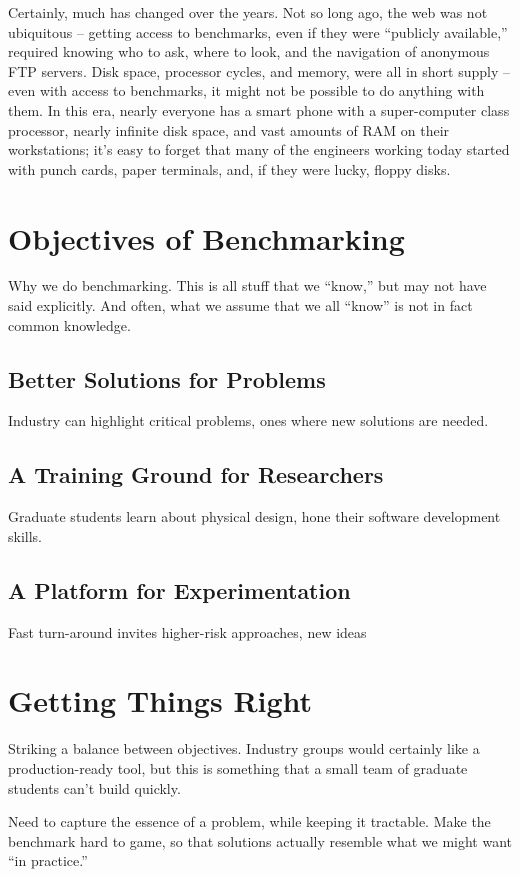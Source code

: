 \documentclass[sigconf]{acmart}
\begin{document}
Certainly, much has changed over the years.  Not so long ago, the
web was not ubiquitous -- getting access to benchmarks, even if they
were ``publicly available,'' required knowing who to ask, where to
look, and the navigation of anonymous FTP servers.  Disk space,
processor cycles, and memory, were all in short supply -- even with
access to benchmarks, it might not be possible to do anything with them.
In this era, nearly everyone has a smart phone with a super-computer
class processor, nearly infinite disk space, and vast amounts of
RAM on their workstations; it's easy to forget that many of the engineers
working today started with punch cards, paper terminals, and, if they
were lucky, floppy disks.


\section{Objectives of Benchmarking}
Why we do benchmarking.  This is all stuff that we ``know,'' but
may not have said explicitly.  And often, what we assume that we
all ``know'' is not in fact common knowledge.

\subsection{Better Solutions for Problems}
Industry can highlight critical problems, ones where new solutions
are needed.

\subsection{A Training Ground for Researchers}
Graduate students learn about physical design, hone their software
development skills.

\subsection{A Platform for Experimentation}
Fast turn-around invites higher-risk approaches, new ideas


\section{Getting Things Right}

Striking a balance between objectives.  Industry groups
would certainly like a production-ready tool, but this is
something that a small team of graduate students can't
build quickly.

Need to capture the essence of a problem, while keeping it
tractable.  Make the benchmark hard to game, so that solutions
actually resemble what we might want ``in practice.''
\end{document}

